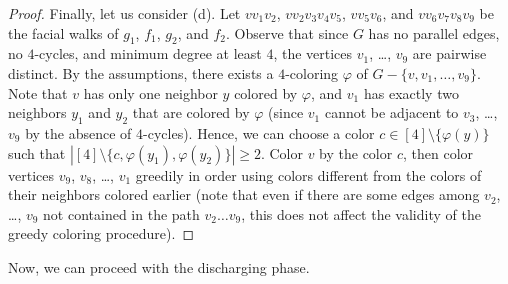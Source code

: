 \documentclass[12pt,twoside,openright,a4paper]{book}
\begin{document}
\begin{proof}
Finally, let us consider (d).  Let $vv_1v_2$, $vv_2v_3v_4v_5$, $vv_5v_6$, and $vv_6v_7v_8v_9$ be the facial walks of
$g_1$, $f_1$, $g_2$, and $f_2$.  Observe that since $G$ has no parallel edges, no $4$-cycles, and minimum degree at least $4$,
the vertices $v_1$, \ldots, $v_9$ are pairwise distinct.  By the assumptions, there exists a $4$-coloring $\varphi$ of $G-\{v,v_1,\ldots,v_9\}$.
Note that $v$ has only one neighbor $y$ colored by $\varphi$, and $v_1$ has exactly two neighbors $y_1$ and $y_2$ that are
colored by $\varphi$ (since $v_1$ cannot be adjacent to $v_3$, \ldots, $v_9$ by the absence of $4$-cycles).
Hence, we can choose a color $c\in[4]\setminus\{\varphi(y)\}$ such that $|[4]\setminus\{c,\varphi(y_1),\varphi(y_2)\}|\ge 2$.
Color $v$ by the color $c$, then color vertices $v_9$, $v_8$, \ldots, $v_1$ greedily in order using colors different
from the colors of their neighbors colored earlier (note that even if there are some
edges among $v_2$, \ldots, $v_9$ not contained in the path $v_2\ldots v_9$, this does not affect the validity of the
greedy coloring procedure).
\end{proof}

Now, we can proceed with the discharging phase.
\end{document}
